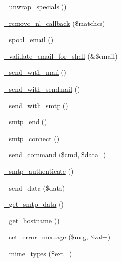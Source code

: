 \begin{DoxyCompactItemize}
\item 
\mbox{\hyperlink{class_c_i___email_af50bcab235f0eff47d7117d77733f1d9}{\+\_\+unwrap\+\_\+specials}} ()
\item 
\mbox{\hyperlink{class_c_i___email_a3a624f07cca99fe6ab1b61dbec56eef8}{\+\_\+remove\+\_\+nl\+\_\+callback}} (\$matches)
\item 
\mbox{\hyperlink{class_c_i___email_a5d45a2f98c27332dfe78086c88eafd3c}{\+\_\+spool\+\_\+email}} ()
\item 
\mbox{\hyperlink{class_c_i___email_a468f4ab8b122318d39baffe9e727d2be}{\+\_\+validate\+\_\+email\+\_\+for\+\_\+shell}} (\&\$email)
\item 
\mbox{\hyperlink{class_c_i___email_ae7e626556c4d619a7214bee6056badd4}{\+\_\+send\+\_\+with\+\_\+mail}} ()
\item 
\mbox{\hyperlink{class_c_i___email_a22ce9dc271da86e2a25041aa70e02502}{\+\_\+send\+\_\+with\+\_\+sendmail}} ()
\item 
\mbox{\hyperlink{class_c_i___email_a691e57a39f6f8956c5054fd7b109bb12}{\+\_\+send\+\_\+with\+\_\+smtp}} ()
\item 
\mbox{\hyperlink{class_c_i___email_a275593e37ea7d04035b5ce80d8934a13}{\+\_\+smtp\+\_\+end}} ()
\item 
\mbox{\hyperlink{class_c_i___email_ae57fde4883dcd1dec9f8999efef13f06}{\+\_\+smtp\+\_\+connect}} ()
\item 
\mbox{\hyperlink{class_c_i___email_a5431c3309ee720b3d1cc55c892359371}{\+\_\+send\+\_\+command}} (\$cmd, \$data=\textquotesingle{}\textquotesingle{})
\item 
\mbox{\hyperlink{class_c_i___email_a708494a94d2083993ede37cf65a0c0fa}{\+\_\+smtp\+\_\+authenticate}} ()
\item 
\mbox{\hyperlink{class_c_i___email_a42fa768e8678b3c1462762b9b812a302}{\+\_\+send\+\_\+data}} (\$data)
\item 
\mbox{\hyperlink{class_c_i___email_ac421324c92e681315a1f2d0d7fa96a5b}{\+\_\+get\+\_\+smtp\+\_\+data}} ()
\item 
\mbox{\hyperlink{class_c_i___email_ad2d333b7bb9f6c25400714dd8931fe11}{\+\_\+get\+\_\+hostname}} ()
\item 
\mbox{\hyperlink{class_c_i___email_a5f00196f0653becd7f5a7a590eaf0085}{\+\_\+set\+\_\+error\+\_\+message}} (\$msg, \$val=\textquotesingle{}\textquotesingle{})
\item 
\mbox{\hyperlink{class_c_i___email_a7581ef570bb25b483e80ee996c42e454}{\+\_\+mime\+\_\+types}} (\$ext=\textquotesingle{}\textquotesingle{})
\end{DoxyCompactItemize}
